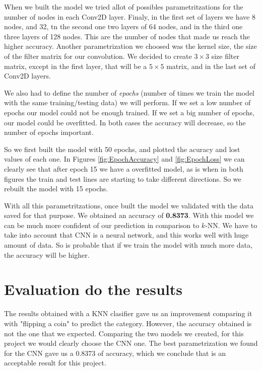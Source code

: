 \documentclass{article}
\begin{document}
When we built the model we tried allot of possibles parametritzations for the number of nodes in each Conv2D layer. Finaly, in the first set of layers we have 8 nodes, and 32, tn the second one two layers of 64 nodes, and in the third one three layers of 128 nodes. This are the number of nodes that made us reach the higher accuracy. Another parametrization we choosed was the kernel size, the size of the filter matrix for our convolution. We decided to create $3 \times 3$ size filter matrix, except in the first layer, that will be a $5 \times 5$ matrix, and in the last set of Conv2D layers.

We also had to define the number of \textit{epochs} (number of times we train the model with the same training/testing data) we will perform. If we set a low number of epochs our model could not be enough trained. If we set a big number of epochs, our model could be overfitted. In both cases the accuracy will decrease, so the number of epochs important.

So we first built the model with 50 epochs, and plotted the acuracy and lost values of each one. In Figures \ref{fig:EpochAccuracy} and \ref{fig:EpochLoss} we can clearly see that after epoch 15 we have a overfitted model, as is when in both figures the train and test lines are starting to take different directions. So we rebuilt the model with 15 epochs.

With all this parametritzations, once built the model we validated with the data saved for that purpose. We obtained an accuracy of \textbf{0.8373}. With this model we can be much more confident of our prediction in comparison to $k$-NN. We have to take into account that CNN is a neural network, and this works well with huge amount of data. So is probable that if we train the model with much more data, the accuracy will be higher.

\section{Evaluation do the results}

The results obtained with a KNN clasifier gave us an improvement comparing it with "flipping a coin" to predict the category. However, the accuracy obtained is not the one that we expected.  Comparing the two models we created, for this project we would clearly choose the CNN one. The best parametrization we found for the CNN gave us a 0.8373 of accuracy, which we conclude that is an acceptable result for this project. 
\end{document}
